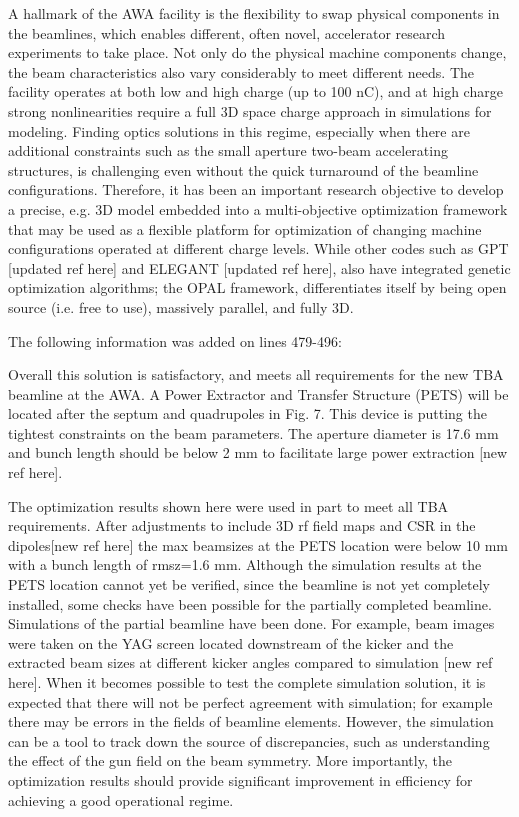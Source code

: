 \documentclass{article}
\begin{document}
{A hallmark of the AWA facility is the flexibility to swap physical
components in the beamlines, which enables different, often novel,
accelerator research experiments to take place.  Not only do the
physical machine components change, the beam characteristics also vary
considerably to meet different needs.  The facility operates at both low
and high charge (up to 100 nC), and at high charge strong nonlinearities
require a full 3D space charge approach in simulations for modeling.  
Finding optics solutions in this regime, especially when
there are additional constraints such as the small aperture two-beam
accelerating structures, is challenging even without the quick
turnaround of the beamline configurations.  Therefore, it has been an
important research objective to develop a precise, e.g. 3D model
embedded into a multi-objective optimization framework that may be used
as a flexible platform for optimization of changing machine
configurations operated at different charge levels. While other codes
such as GPT [updated ref here] and ELEGANT [updated ref here], also have
integrated genetic optimization algorithms; the OPAL framework,
differentiates itself by being open source (i.e. free to use), massively
parallel, and fully 3D.


The following information was added on lines 479-496:


Overall this solution is satisfactory, and meets all requirements for the new TBA beamline at the AWA.
A Power Extractor and Transfer Structure (PETS) will be located after the septum and quadrupoles in Fig. 7.
This device is putting the tightest constraints on the beam parameters.  
The aperture diameter is 17.6 mm and bunch length should be below 2 mm
to facilitate large power extraction [new ref here].  

The optimization results shown here were used in part to meet all TBA requirements. 
After adjustments to include 3D rf field maps and CSR in the dipoles[new ref here] 
the max beamsizes at the PETS location were below 10 mm with a bunch length of rmsz=1.6 mm. 
Although the simulation results at the PETS location cannot yet be verified, since the beamline is not yet completely installed, 
some checks have been possible for the partially completed beamline.  
Simulations of the partial beamline have been done.
For example, beam images were taken on the YAG screen located downstream of the kicker and 
the extracted beam sizes at different kicker angles compared to simulation [new ref here].  
When it becomes possible to test the complete simulation solution, it is expected that there will not be perfect agreement with simulation;
for example there may be errors in the fields of beamline elements.  However, the simulation can be a tool to track down the source of
discrepancies, such as understanding the effect of the gun field on the beam symmetry.  
More importantly, the optimization results should provide significant improvement in efficiency for achieving a good operational regime.


}
\end{document}
